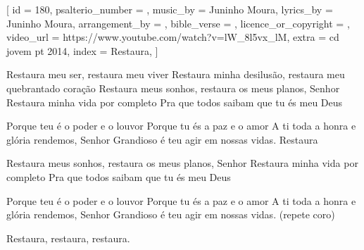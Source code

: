 [
    id                     = {180},
    psalterio_number       = {},
    music_by               = {Juninho Moura},
    lyrics_by              = {Juninho Moura},
    arrangement_by         = {},
    bible_verse            = {},
    licence_or_copyright   = {},
    video_url              = {https://www.youtube.com/watch?v=lW_8l5vx_lM},
    extra                  = {cd jovem pt 2014},
    index                  = {Restaura},
]

\beginverse
Restaura meu ser, restaura meu viver
Restaura minha desilusão, restaura meu quebrantado coração
Restaura meus sonhos, restaura os meus planos, Senhor
Restaura minha vida por completo
Pra que todos saibam que tu és meu Deus
\endverse

\beginchorus
Porque teu é o poder e o louvor
Porque tu és a paz e o amor
A ti toda a honra e glória rendemos, Senhor
Grandioso é teu agir em nossas vidas. Restaura
\endchorus


\beginverse
Restaura meus sonhos, restaura os meus planos, Senhor
Restaura minha vida por completo
Pra que todos saibam que tu és meu Deus
\endverse

\beginchorus
Porque teu é o poder e o louvor
Porque tu és a paz e o amor
A ti toda a honra e glória rendemos, Senhor
Grandioso é teu agir em nossas vidas. (repete coro)

Restaura, restaura, restaura.
\endchorus

\endsong
